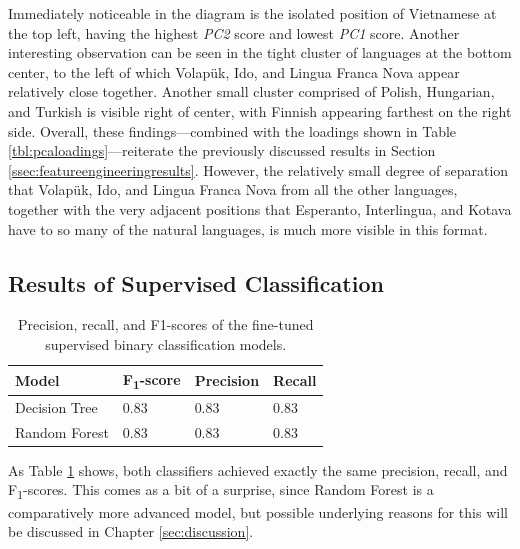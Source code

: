 \documentclass[12pt,a4paper]{article}
\numberwithin{figure}{section}
\numberwithin{table}{section}
\numberwithin{definition}{section}
\begin{document}
Immediately noticeable in the diagram is the isolated position of Vietnamese at the top left, having the highest \textit{PC2} score and lowest \textit{PC1} score. Another interesting observation can be seen in the tight cluster of languages at the bottom center, to the left of which Volapük, Ido, and Lingua Franca Nova appear relatively close together. Another small cluster comprised of Polish, Hungarian, and Turkish is visible right of center, with Finnish appearing farthest on the right side. Overall, these findings---combined with the loadings shown in Table \ref{tbl:pcaloadings}---reiterate the previously discussed results in Section \ref{ssec:featureengineeringresults}. However, the relatively small degree of separation that Volapük, Ido, and Lingua Franca Nova from all the other languages, together with the very adjacent positions that Esperanto, Interlingua, and Kotava have to so many of the natural languages, is much more visible in this format.


\subsection{Results of Supervised Classification}
\label{ssec:classificationresults}

\begin{table}[!h]
  \centering
  \caption{Precision, recall, and F1-scores of the fine-tuned supervised binary classification models.}
  \renewcommand{\arraystretch}{1.0}
  \begin{tabular}{|l|l|l|l|}
  \hline
      \textbf{Model} & \textbf{F\textsubscript{1}-score} & \textbf{Precision} & \textbf{Recall} \\ \hline
      Decision Tree & 0.83 & 0.83 & 0.83 \\ 
      Random Forest & 0.83 & 0.83 & 0.83 \\ \hline
  \end{tabular}
  \label{tbl:supervisedevaluation}
\end{table}

As Table \ref{tbl:supervisedevaluation} shows, both classifiers achieved exactly the same precision, recall, and F\textsubscript{1}-scores. This comes as a bit of a surprise, since Random Forest is a comparatively more advanced model, but possible underlying reasons for this will be discussed in Chapter \ref{sec:discussion}.
\end{document}
